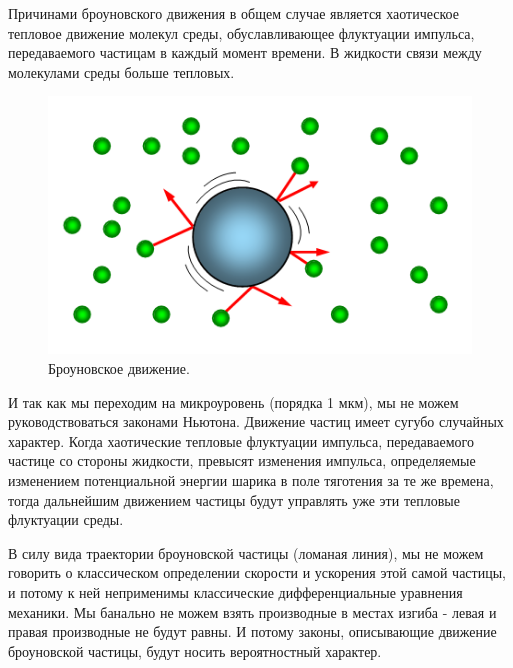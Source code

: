 \documentclass[a4paper,14pt]{article}
\begin{document}
Причинами броуновского движения в общем случае является хаотическое тепловое движение молекул среды, обуславливающее флуктуации импульса, передаваемого частицам в каждый момент времени. В жидкости связи между молекулами среды больше тепловых.

\begin{figure}[h]
    \centering
    \includegraphics[scale=1]{brown.png}
    \caption{Броуновское движение.}
\end{figure}

И так как мы переходим на микроуровень (порядка 1 мкм), мы не можем руководствоваться законами Ньютона. Движение частиц имеет сугубо случайных характер. Когда хаотические тепловые флуктуации импульса, передаваемого
частице со стороны жидкости, превысят изменения импульса, определяемые изменением
потенциальной энергии шарика в поле тяготения за те же времена, тогда дальнейшим
движением частицы будут управлять уже эти тепловые флуктуации среды.

В силу вида траектории броуновской частицы (ломаная линия), мы не можем говорить о классическом определении скорости и ускорения этой самой частицы, и потому к ней неприменимы классические дифференциальные уравнения механики. Мы банально не можем взять производные в местах изгиба - левая и правая производные не будут равны. И потому законы, описывающие движение броуновской частицы, будут носить вероятностный характер.
\end{document}
